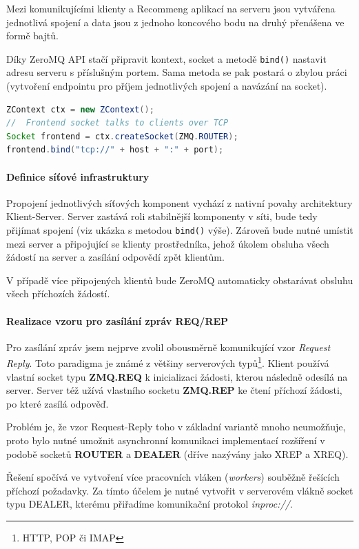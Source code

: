 \documentclass[thesis=M,czech]{FITthesis}[2014/05/07]
\begin{document}
Mezi komunikujícími klienty a Recommeng aplikací na serveru jsou vytvářena jednotlivá spojení a data jsou z jednoho koncového bodu na druhý přenášena ve formě bajtů.

Díky ZeroMQ API stačí připravit kontext, socket a metodě \texttt{bind()} nastavit adresu serveru s příslušným portem. Sama metoda se pak postará o zbylou práci (vytvoření endpointu pro příjem jednotlivých spojení a navázání na socket).

\begin{lstlisting}[language=java]
ZContext ctx = new ZContext();
//  Frontend socket talks to clients over TCP
Socket frontend = ctx.createSocket(ZMQ.ROUTER);
frontend.bind("tcp://" + host + ":" + port);
\end{lstlisting}

\paragraph{Definice síťové infrastruktury}
\label{subsub:queue}
Propojení jednotlivých síťových komponent vychází z nativní povahy architektury Klient-Server. Server zastává roli stabilnější komponenty v síti, bude tedy přijímat spojení (viz ukázka s metodou \texttt{bind()} výše). Zároveň bude nutné umístit mezi server a připojující se klienty prostředníka, jehož úkolem obsluha všech žádostí na server a zasílání odpovědí zpět klientům.

V případě více připojených klientů bude ZeroMQ automaticky obstarávat obsluhu všech příchozích žádostí. 

\paragraph{Realizace vzoru pro zasílání zpráv REQ/REP}
Pro zasílání zpráv jsem nejprve zvolil obousměrně komunikující vzor \emph{Request Reply}. Toto paradigma je známé z většiny serverových typů\footnote{HTTP, POP či IMAP}. Klient používá vlastní socket typu \textbf{ZMQ.REQ} k inicializaci žádosti, kterou následně odesílá na server. Server též užívá vlastního socketu \textbf{ZMQ.REP} ke čtení příchozí žádosti, po které zasílá odpověď. 

Problém je, že vzor Request-Reply toho v základní variantě mnoho neumožňuje, proto bylo nutné umožnit asynchronní komunikaci implementací rozšíření v podobě socketů \textbf{ROUTER} a \textbf{DEALER} (dříve nazývány jako XREP a XREQ). 

Řešení spočívá ve vytvoření více pracovních vláken (\emph{workers}) souběžně řešících příchozí požadavky. Za tímto účelem je nutné vytvořit v serverovém vlákně socket typu DEALER, kterému přiřadíme komunikační protokol \emph{inproc://}.
\end{document}
